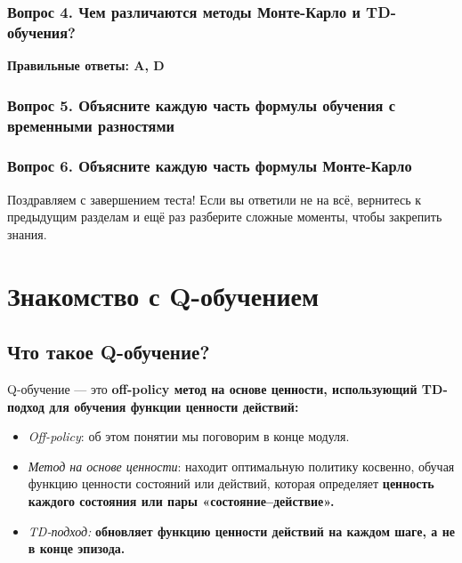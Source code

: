 \documentclass[11pt,a4paper]{article}
\begin{document}
\subsubsection{Вопрос 4. Чем различаются методы Монте-Карло и TD-обучения?}\label{q4-what-is-the-difference-between-monte-carlo-and-temporal-difference-learning-methods-1}

\textbf{Правильные ответы: A, D}

\subsubsection{Вопрос 5. Объясните каждую часть формулы обучения с временными разностями}\label{q5-define-each-part-of-temporal-difference-learning-formula-1}


\subsubsection{Вопрос 6. Объясните каждую часть формулы Монте-Карло}\label{q6-define-each-part-of-monte-carlo-learning-formula-1}


Поздравляем с завершением теста! Если вы ответили не на всё, вернитесь к предыдущим разделам и ещё раз разберите сложные моменты, чтобы закрепить знания.

\section{Знакомство с Q-обучением}\label{introducing-q-learning}

\subsection{Что такое Q-обучение?}\label{what-is-q-learning}

Q-обучение --- это \textbf{off-policy метод на основе ценности, использующий TD-подход для обучения функции ценности действий:}

\begin{itemize}
\tightlist
\item
  \emph{Off-policy}: об этом понятии мы поговорим в конце модуля.
\item
  \emph{Метод на основе ценности}: находит оптимальную политику косвенно, обучая функцию ценности состояний или действий, которая определяет \textbf{ценность каждого состояния или пары «состояние--действие».}
\item
  \emph{TD-подход:} \textbf{обновляет функцию ценности действий на каждом шаге, а не в конце эпизода.}
\end{itemize}
\end{document}
